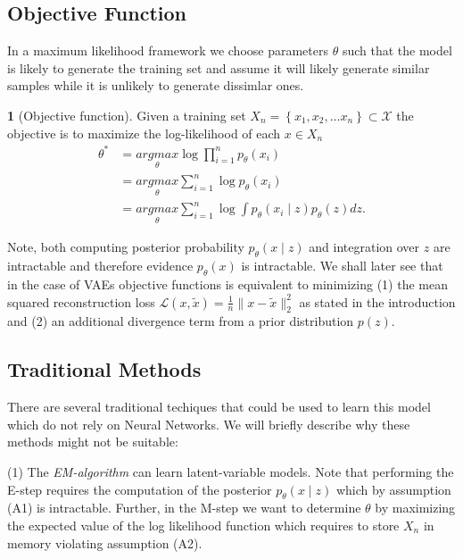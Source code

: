 \documentclass[11pt]{article}
\theoremstyle{plain}
\theoremstyle{definition}
\newtheorem{defn}[thm]{\protect\definitionname}
\theoremstyle{plain}
\providecommand{\definitionname}{Definition}
\begin{document}
\subsection{Objective Function}

In a maximum likelihood framework we choose parameters $\theta$ such
that the model is likely to generate the training set and assume it
will likely generate similar samples while it is unlikely to generate
dissimlar ones.
\begin{defn}[Objective function]
Given a training set $X_{n}=\left\{ x_{1},x_{2},\ldots x_{n}\right\} \subset\mathcal{X}$
the objective is to maximize the log-likelihood of each $x\in X_{n}$
\begin{equation}
\begin{aligned}\theta^{*} & =\underset{\theta}{argmax}\log\prod_{i=1}^{n}p_{\theta}(x_{i})\\
 & =\underset{\theta}{argmax}\sum_{i=1}^{n}\log p_{\theta}(x_{i})\\
 & =\underset{\theta}{argmax}\sum_{i=1}^{n}\log\int p_{\theta}(x_{i}\mid z)p_{\theta}(z)dz.
\end{aligned}
\label{eq:log_like}
\end{equation}

Note, both computing posterior probability $p_{\theta}(x\mid z)$
and integration over $z$ are intractable and therefore evidence $p_{\theta}(x)$
is intractable. We shall later see that in the case of VAEs objective
functions is equivalent to minimizing (1) the mean squared reconstruction
loss $\mathcal{L}(x,\tilde{x})=\frac{1}{n}\lVert x-\tilde{x}\rVert_{2}^{2}$
as stated in the introduction and (2) an additional divergence term
from a prior distribution $p(z)$.
\end{defn}

\subsection{Traditional Methods}

There are several traditional techiques that could be used to learn
this model which do not rely on Neural Networks. We will briefly describe
why these methods might not be suitable:

(1) The \textit{EM-algorithm} can learn latent-variable models. Note
that performing the E-step requires the computation of the posterior
$p_{\theta}(x\mid z)$ which by assumption (A1) is intractable. Further,
in the M-step we want to determine $\theta$ by maximizing the expected
value of the log likelihood function which requires to store $X_{n}$
in memory violating assumption (A2).
\end{document}
